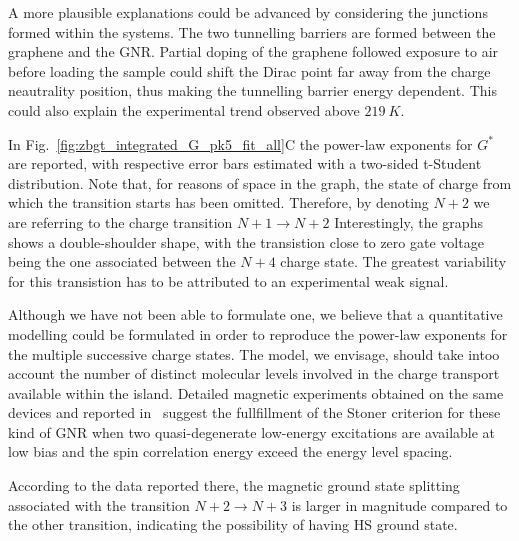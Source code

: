 A more plausible explanations could be advanced by considering the junctions formed within the systems. The two tunnelling barriers are formed between the graphene and the GNR. Partial doping of the graphene followed exposure to air before loading the sample could shift the Dirac point far away from the charge neautrality position, thus making the tunnelling barrier energy dependent. This could also explain the experimental trend observed above $\SI[separate-uncertainty = true]{219}{K}$.

In Fig.~\ref{fig:zbgt_integrated_G_pk5_fit_all}C the power-law exponents for $G^*$ are reported, with respective error bars estimated with a two-sided t-Student distribution. Note that, for reasons of space in the graph, the state of charge from which the transition starts has been omitted. Therefore, by denoting $N+2$ we are referring to the charge transition $N+1\rightarrow N+2$
Interestingly, the graphs shows a double-shoulder shape, with the transistion close to zero gate voltage being the one associated between the $N+4$ charge state. The greatest variability for this transistion has to be attributed to an experimental weak signal.

Although we have not been able to formulate one, we believe that a quantitative modelling could be formulated in order to  reproduce the power-law exponents for the multiple successive charge states. The model, we envisage, should take intoo account the number of distinct molecular levels involved in the charge transport available within the island. Detailed magnetic experiments obtained on the same devices and reported in~\cite{sopp2021phd} suggest the fullfillment of the Stoner criterion for these kind of \gls{GNR} when two quasi-degenerate low-energy excitations are available at low bias and the spin correlation energy exceed the energy level spacing.

According to the data reported there, the magnetic ground state splitting associated with the transition $N+2\rightarrow N+3$ is larger in magnitude compared to the other transition, indicating the possibility of having \gls{HS} ground state.


